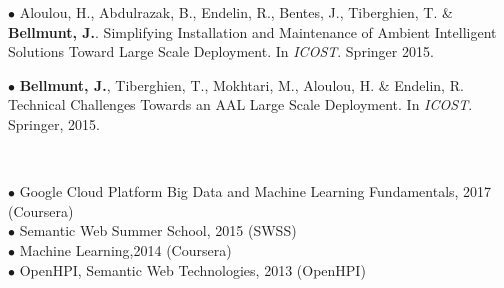 \documentclass[paper=a4,fontsize=11pt]{temp} %
\begin{document}
\begin{minipage}{0.88\linewidth}
\begin{footnotesize}
$\bullet$ Aloulou, H., Abdulrazak, B., Endelin, R., Bentes, J., Tiberghien, T. \& \textbf{\textcolor{blueCV}{Bellmunt, J.}}. Simplifying Installation and Maintenance of Ambient Intelligent Solutions Toward Large Scale Deployment. In \textit{ICOST}. Springer 2015.

$\bullet$ \textbf{\textcolor{blueCV}{Bellmunt, J.}}, Tiberghien, T., Mokhtari, M., Aloulou, H. \& Endelin, R. Technical Challenges Towards an AAL Large Scale Deployment. In \textit{ICOST}. Springer, 2015.

\end{footnotesize}

 \end{minipage} 



\begin{minipage}{0.065\linewidth}
	\hspace{\linewidth}
\end{minipage}%
\begin{minipage}{0.88\linewidth}
\vspace{-1ex}
\textbf{\color{subheadings}{Courses}}\\
\begin{footnotesize}
$\bullet$ Google Cloud Platform Big Data and Machine Learning Fundamentals, 2017 (Coursera) \\
$\bullet$ Semantic Web Summer School, 2015 (SWSS)\\
$\bullet$ Machine Learning,2014 (Coursera) \\
$\bullet$ OpenHPI, Semantic Web Technologies, 2013 (OpenHPI)\\
\end{footnotesize}
\vspace{1.5ex}
\textbf{\color{subheadings}{Awards}}
\vspace{1ex}



\end{minipage}

\end{document}
